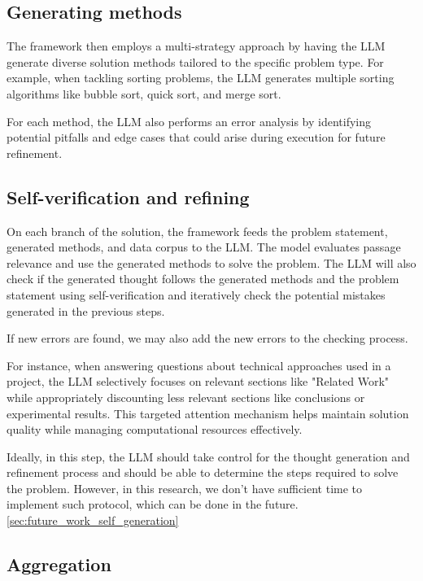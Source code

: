 \documentclass{article}
\begin{document}
\subsection{Generating methods}

The framework then employs a multi-strategy approach by having the LLM generate diverse solution methods tailored to the specific problem type. For example, when tackling sorting problems, the LLM generates multiple sorting algorithms like bubble sort, quick sort, and merge sort. 

For each method, the LLM also performs an error analysis by identifying potential pitfalls and edge cases that could arise during execution for future refinement.

\subsection{Self-verification and refining}

On each branch of the solution, the framework feeds the problem statement, generated methods, and data corpus to the LLM. The model evaluates passage relevance and use the generated methods to solve the problem. The LLM will also check if the generated thought follows the generated methods and the problem statement using self-verification \cite{weng2023largelanguagemodelsbetter} and iteratively check the potential mistakes generated in the previous steps.

If new errors are found, we may also add the new errors to the checking process.

For instance, when answering questions about technical approaches used in a project, the LLM selectively focuses on relevant sections like "Related Work" while appropriately discounting less relevant sections like conclusions or experimental results. This targeted attention mechanism helps maintain solution quality while managing computational resources effectively.

Ideally, in this step, the LLM should take control for the thought generation and refinement process and should be able to determine the steps required to solve the problem. However, in this research, we don't have sufficient time to implement such protocol, which can be done in the future. \ref{sec:future_work_self_generation}

\subsection{Aggregation}
\end{document}
